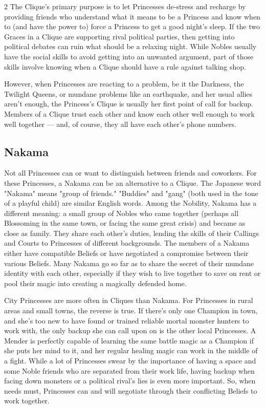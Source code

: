 \begin{multicols}{2}
The Clique's primary purpose is to let Princesses de-stress and recharge by providing friends who understand what it means to be a Princess and know when to (and have the power to) force a Princess to get a good night's sleep. If the two Graces in a Clique are supporting rival political parties, then getting into political debates can ruin what should be a relaxing night. While Nobles usually have the social skills to avoid getting into an unwanted argument, part of those skills involve knowing when a Clique should have a rule against talking shop.

However, when Princesses are reacting to a problem, be it the Darkness, the Twilight Queens, or mundane problems like an earthquake, and her usual allies aren't enough, the Princess's Clique is usually her first point of call for backup. Members of a Clique trust each other and know each other well enough to work well together — and, of course, they all have each other's phone numbers. 

\subsection*{Nakama}

Not all Princesses can or want to distinguish between friends and coworkers. For these Princesses, a Nakama can be an alternative to a Clique. The Japanese word "Nakama" means "group of friends." "Buddies" and "gang" (both used in the tone of a playful child) are similar English words. Among the Nobility, Nakama has a different meaning: a small group of Nobles who came together (perhaps all Blossoming in the same town, or facing the same great crisis) and became as close as family. They share each other's duties, lending the skills of their Callings and Courts to Princesses of different backgrounds. The members of a Nakama either have compatible Beliefs or have negotiated a compromise between their various Beliefs. Many Nakama go so far as to share the secret of their mundane identity with each other, especially if they wish to live together to save on rent or pool their magic into creating a magically defended home. 

City Princesses are more often in Cliques than Nakama. For Princesses in rural areas and small towns, the reverse is true. If there's only one Champion in town, and she's too new to have found or trained reliable mortal monster hunters to work with, the only backup she can call upon on is the other local Princesses. A Mender is perfectly capable of learning the same battle magic as a Champion if she puts her mind to it, and her regular healing magic can work in the middle of a fight. While a lot of Princesses swear by the importance of having a space and some Noble friends who are separated from their work life, having backup when facing down monsters or a political rival's lies is even more important. So, when needs must, Princesses can and will negotiate through their conflicting Beliefs to work together. 


\end{multicols}
